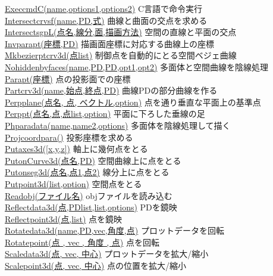 \documentclass[papersize,a4paper,12pt,uplatex]{jsarticle}
\begin{document}
\begin{tabbing}
\hyperlink{execcmdc}{ExeccmdC(name,options1,options2)}  \>C言語で命令実行\\
\hyperlink{intersectcrvsf}{Intersectcrvsf(name,PD,式)}  \>曲線と曲面の交点を求める\\
\hyperlink{intersectsgpL}{IntersectsgpL(点名,線分,面,描画方法)}  \>空間の直線と平面の交点\\
\hyperlink{invparapt}{Invparapt(座標,PD)}  \>描画面座標に対応する曲線上の座標\\
\hyperlink{mkbezierptcrv3d}{Mkbezierptcrv3d(点list)}  \>制御点を自動的にとる空間ベジェ曲線\\
\hyperlink{nohiddenbyfaces}{Nohiddenbyfaces(name,PD,PD,opt1,opt2)}  \>多面体と空間曲線を陰線処理\\
\hyperlink{parapt}{Parapt(座標)}  \>点の投影面での座標\\
\hyperlink{partcrv3d}{Partcrv3d(name,始点,終点,PD)}  \>曲線PDの部分曲線を作る\\
\hyperlink{perpplane}{Perpplane(点名, 点, ベクトル,option)}  \>点を通り垂直な平面上の基準点\\
\hyperlink{perppt}{Perppt(点名,点,点list,option)}  \>平面に下ろした垂線の足\\
\hyperlink{phparadata}{Phparadata(name,name2,options)}  \>多面体を陰線処理して描く\\
\hyperlink{projcoordpara}{Projcoordpara()}  \>投影座標を求める\\
\hyperlink{putaxes3d}{Putaxes3d([x,y,z])}  \>軸上に幾何点をとる\\
\hyperlink{putonCurve3d}{PutonCurve3d(点名,PD)}  \>空間曲線上に点をとる\\
\hyperlink{putonseg3d}{Putonseg3d(点名,点1,点2)}  \>線分上に点をとる\\
\hyperlink{putpoint3d}{Putpoint3d(list,option)}  \>空間点をとる\\
\hyperlink{readobj}{Readobj(ファイル名)}  \>objファイルを読み込む\\
\hyperlink{reflectdata3d}{Reflectdata3d(点,PDlist,list,options)}  \>PDを鏡映\\
\hyperlink{reflectpoint3d}{Reflectpoint3d(点,list)}  \>点を鏡映\\
\hyperlink{rotatedata3d}{Rotatedata3d(name,PD,vec,角度,点)}  \>プロットデータを回転\\
\hyperlink{rotatepoint3d}{Rotatepoint(点 , vec , 角度 , 点)}  \>点を回転\\
\hyperlink{scaledata3d}{Scaledata3d(点, vec, 中心)}  \>プロットデータを拡大/縮小\\
\hyperlink{scalepoint3d}{Scalepoint3d(点, vec, 中心)}  \>点の位置を拡大/縮小\\

\end{tabbing}
\end{document}
